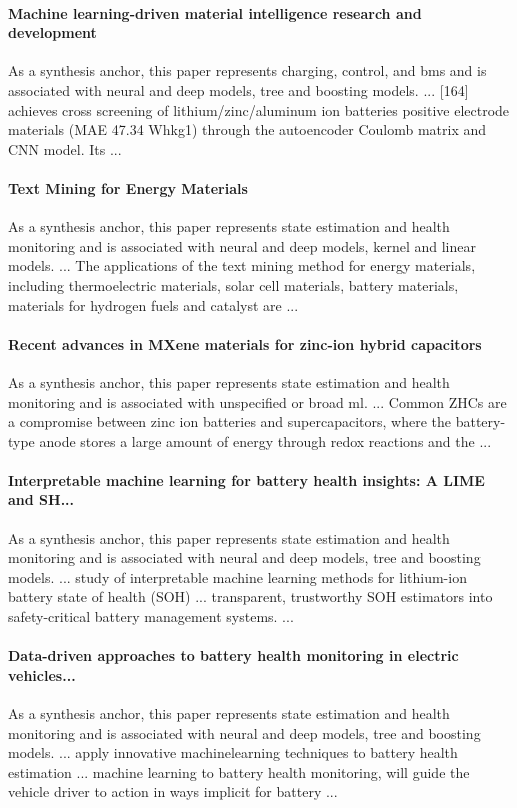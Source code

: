 \documentclass[journal]{IEEEtran}
\begin{document}
\paragraph{Machine learning-driven material intelligence research and development} As a synthesis anchor, this paper represents charging, control, and bms and is associated with neural and deep models, tree and boosting models. ... [164] achieves cross screening of lithium/zinc/aluminum ion batteries positive electrode materials (MAE 47.34 Whkg1) through the autoencoder Coulomb matrix and CNN model. Its ... \cite{machinelearningdriven2025}

\paragraph{Text Mining for Energy Materials} As a synthesis anchor, this paper represents state estimation and health monitoring and is associated with neural and deep models, kernel and linear models. ... The applications of the text mining method for energy materials, including thermoelectric materials, solar cell materials, battery materials, materials for hydrogen fuels and catalyst are ... \cite{textminingfor2022}

\paragraph{Recent advances in MXene materials for zinc-ion hybrid capacitors} As a synthesis anchor, this paper represents state estimation and health monitoring and is associated with unspecified or broad ml. ... Common ZHCs are a compromise between zinc ion batteries and supercapacitors, where the battery-type anode stores a large amount of energy through redox reactions and the ... \cite{recentadvancesin2025}

\paragraph{Interpretable machine learning for battery health insights: A LIME and SH...} As a synthesis anchor, this paper represents state estimation and health monitoring and is associated with neural and deep models, tree and boosting models. ... study of interpretable machine learning methods for lithium-ion battery state of health (SOH) ... transparent, trustworthy SOH estimators into safety-critical battery management systems. ... \cite{interpretablemachinelear2025}

\paragraph{Data-driven approaches to battery health monitoring in electric vehicles...} As a synthesis anchor, this paper represents state estimation and health monitoring and is associated with neural and deep models, tree and boosting models. ... apply innovative machinelearning techniques to battery health estimation ... machine learning to battery health monitoring, will guide the vehicle driver to action in ways implicit for battery ... \cite{datadrivenapproaches2024}
\end{document}
